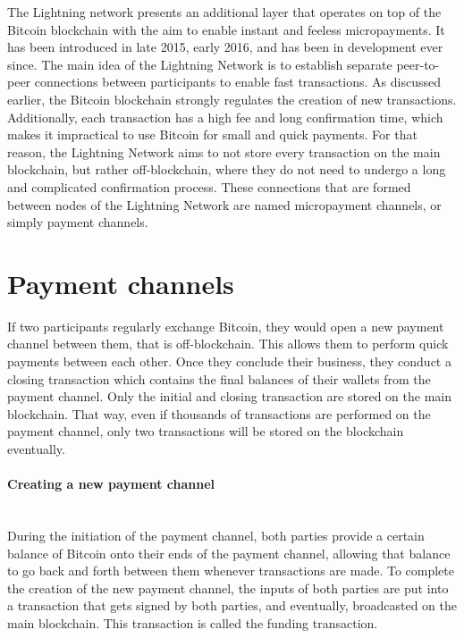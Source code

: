 \documentclass[a4paper, 12pt]{report}
\begin{document}
\par The Lightning network presents an additional layer that operates on top of the Bitcoin blockchain with the aim to enable instant and feeless micropayments. It has been introduced in late 2015, early 2016, and has been in development ever since. The main idea of the Lightning Network is to establish separate peer-to-peer connections between participants to enable fast transactions. As discussed earlier, the Bitcoin blockchain strongly regulates the creation of new transactions. Additionally, each transaction has a high fee and long confirmation time, which makes it impractical to use Bitcoin for small and quick payments. For that reason, the Lightning Network aims to not store every transaction on the main blockchain, but rather off-blockchain, where they do not need to undergo a long and complicated confirmation process. These connections that are formed between nodes of the Lightning Network are named micropayment channels, or simply payment channels.

\section{Payment channels}

\par If two participants regularly exchange Bitcoin, they would open a new payment channel between them, that is off-blockchain. This allows them to perform quick payments between each other. Once they conclude their business, they conduct a closing transaction which contains the final balances of their wallets from the payment channel. Only the initial and closing transaction are stored on the main blockchain. That way, even if thousands of transactions are performed on the payment channel, only two transactions will be stored on the blockchain eventually.

\paragraph{Creating a new payment channel} \hspace{0pt} \\
During the initiation of the payment channel, both parties provide a certain balance of Bitcoin onto their ends of the payment channel, allowing that balance to go back and forth between them whenever transactions are made. To complete the creation of the new payment channel, the inputs of both parties are put into a transaction that gets signed by both parties, and eventually, broadcasted on the main blockchain. This transaction is called the funding transaction.
\end{document}
